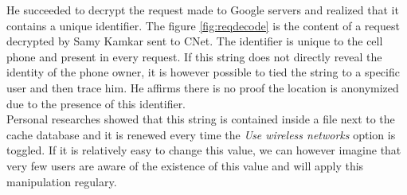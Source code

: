 He succeeded to decrypt the request made to Google servers and realized that it contains a unique identifier\cite{cnet-andr-samy}.
The figure \ref{fig:reqdecode} is the content of a request decrypted by Samy Kamkar sent to CNet.
The identifier is unique to the cell phone and present in every request.
If this string does not directly reveal the identity of the phone owner, it is however possible to tied the string to a specific user and then trace him.
He affirms there is no proof the location is anonymized due to the presence of this identifier.\\

Personal researches showed that this string is contained inside a file next to the cache database and it is renewed every time the \emph{Use wireless networks} option is toggled.
If it is relatively easy to change this value, we can however imagine that very few users are aware of the existence of this value and will apply this manipulation regulary.





